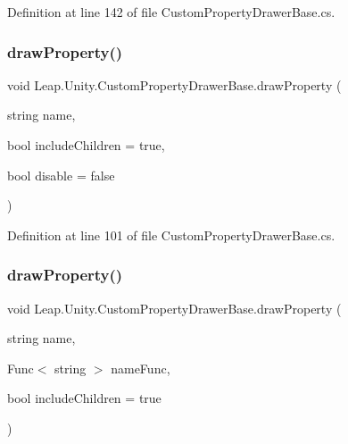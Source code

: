 Definition at line 142 of file Custom\+Property\+Drawer\+Base.\+cs.

\mbox{\label{class_leap_1_1_unity_1_1_custom_property_drawer_base_a4e6c925f85520c7ffdb8498fed683d22}} 
\subsubsection{\texorpdfstring{drawProperty()}{drawProperty()}\hspace{0.1cm}{\footnotesize\ttfamily [1/2]}}
{\footnotesize\ttfamily void Leap.\+Unity.\+Custom\+Property\+Drawer\+Base.\+draw\+Property (\begin{DoxyParamCaption}\item[{string}]{name,  }\item[{bool}]{include\+Children = {\ttfamily true},  }\item[{bool}]{disable = {\ttfamily false} }\end{DoxyParamCaption})\hspace{0.3cm}{\ttfamily [protected]}}



Definition at line 101 of file Custom\+Property\+Drawer\+Base.\+cs.

\mbox{\label{class_leap_1_1_unity_1_1_custom_property_drawer_base_a5490dfb02384c005ddd9d65c39e72132}} 
\subsubsection{\texorpdfstring{drawProperty()}{drawProperty()}\hspace{0.1cm}{\footnotesize\ttfamily [2/2]}}
{\footnotesize\ttfamily void Leap.\+Unity.\+Custom\+Property\+Drawer\+Base.\+draw\+Property (\begin{DoxyParamCaption}\item[{string}]{name,  }\item[{Func$<$ string $>$}]{name\+Func,  }\item[{bool}]{include\+Children = {\ttfamily true} }\end{DoxyParamCaption})\hspace{0.3cm}{\ttfamily [protected]}}




